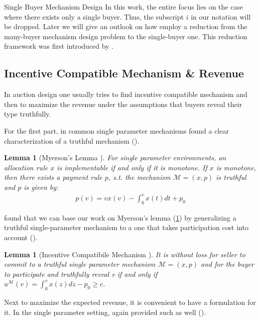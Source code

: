 \documentclass[11pt,a4paper]{article}
\newtheorem{lemma}[theorem]{Lemma}
\newcommand{\1}[1]{\mbox{\rm\bf 1}_{#1}}
\begin{document}
\begin{section}{Single Buyer Mechanism Design}
 In this work, the entire focus lies on the case where there exists only a single buyer.
 Thus, the subscript $i$ in our notation will be dropped.
 Later we will give an outlook on how \citet{primary} employ a reduction from the many-buyer mechanism design problem to the single-buyer one.
 This reduction framework was first introduced by \citet{alaei2012bayesian,alaei2014bayesian}.

 \subsection{Incentive Compatible Mechanism \& Revenue}
 \label{sec:incentive-comptaible-mechanism-revenue}
 In auction design one usually tries to find incentive compatible mechanism and then to maximize the revenue under the assumptions that buyers reveal their type truthfully.

 For the first part, in common single parameter mechanisms \citet{myerson} found a clear characterization of a truthful mechanism ().

 \begin{lemma}[Myerson's Lemma \cite{myerson}]
     \label{lemma:myersons-lemma}
     For single parameter environments, an allocation rule $x$ is implementable if and only if it is monotone.
     If $x$ is monotone, then there exists a payment rule $p$, s.t. the mechanism $\mathcal{M}=(x,p)$ is truthful
     and $p$ is given by:
     \begin{align*}
         p(v) = v x(v) - \int_0^v x(t) dt + p_0
     \end{align*}
 \end{lemma}

 \citet{primary} found that we can base our work on Myerson's lemma (\ref{lemma:myersons-lemma})
 by generalizing a truthful single-parameter mechanism to a one that takes participation cost into account ().

 \begin{lemma}[Incentive Compatibile Mechanism \cite{primary}]
     \label{lemma:thruthful-mechanism}
     It is without loss for seller to commit to a truthful single parameter mechanism $\mathcal{M}=(x,p)$ and
     for the buyer to participate and truthfully reveal v if and only if $u^\mathcal{M}(v) = \int_0^v x(z)dz - p_0 \geq c$.
 \end{lemma}

 Next to maximize the expected revenue, it is convenient to have a formulation for it.
 In the single parameter setting, again \citet{myerson} provided such as well ().


\end{section}
\end{document}
